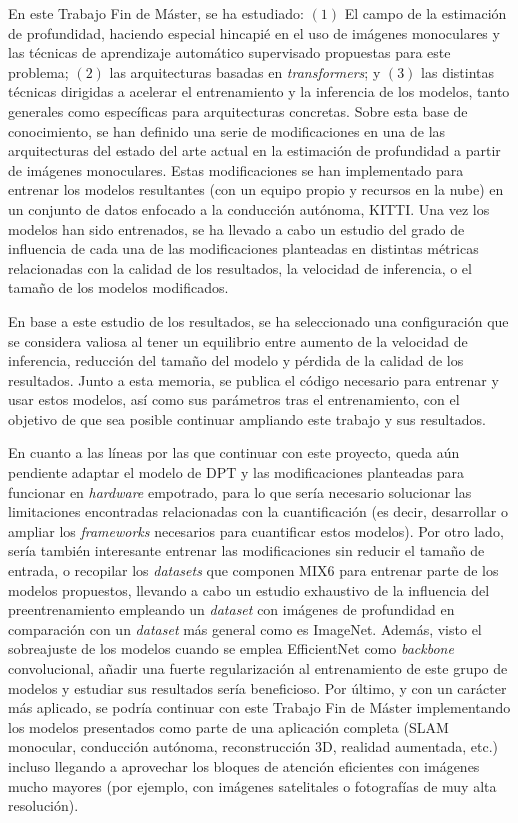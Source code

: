 En este Trabajo Fin de Máster, se ha estudiado: $(1)$ El campo de la estimación de profundidad, haciendo especial hincapié en el uso de imágenes monoculares y las técnicas de aprendizaje automático supervisado propuestas para este problema; $(2)$ las arquitecturas basadas en \textit{transformers}; y $(3)$ las distintas técnicas dirigidas a acelerar el entrenamiento y la inferencia de los modelos, tanto generales como específicas para arquitecturas concretas. Sobre esta base de conocimiento, se han definido una serie de modificaciones en una de las arquitecturas del estado del arte actual en la estimación de profundidad a partir de imágenes monoculares. Estas modificaciones se han implementado para entrenar los modelos resultantes (con un equipo propio y recursos en la nube) en un conjunto de datos enfocado a la conducción autónoma, KITTI. Una vez los modelos han sido entrenados, se ha llevado a cabo un estudio del grado de influencia de cada una de las modificaciones planteadas en distintas métricas relacionadas con la calidad de los resultados, la velocidad de inferencia, o el tamaño de los modelos modificados. 

En base a este estudio de los resultados, se ha seleccionado una configuración que se considera valiosa al tener un equilibrio entre aumento de la velocidad de inferencia, reducción del tamaño del modelo y pérdida de la calidad de los resultados. Junto a esta memoria, se publica el código necesario para entrenar y usar estos modelos, así como sus parámetros tras el entrenamiento, con el objetivo de que sea posible continuar ampliando este trabajo y sus resultados.

En cuanto a las líneas por las que continuar con este proyecto, queda aún pendiente adaptar el modelo de DPT y las modificaciones planteadas para funcionar en \textit{hardware} empotrado, para lo que sería necesario solucionar las limitaciones encontradas relacionadas con la cuantificación (es decir, desarrollar o ampliar los \textit{frameworks} necesarios para cuantificar estos modelos). Por otro lado, sería también interesante entrenar las modificaciones sin reducir el tamaño de entrada, o recopilar los \textit{datasets} que componen MIX6 para entrenar parte de los modelos propuestos, llevando a cabo un estudio exhaustivo de la influencia del preentrenamiento empleando un \textit{dataset} con imágenes de profundidad en comparación con un \textit{dataset} más general como es ImageNet. Además, visto el sobreajuste de los modelos cuando se emplea EfficientNet como \textit{backbone} convolucional, añadir una fuerte regularización al entrenamiento de este grupo de modelos y estudiar sus resultados sería beneficioso. Por último, y con un carácter más aplicado, se podría continuar con este Trabajo Fin de Máster implementando los modelos presentados como parte de una aplicación completa (SLAM monocular, conducción autónoma, reconstrucción 3D, realidad aumentada, etc.) incluso llegando a aprovechar los bloques de atención eficientes con imágenes mucho mayores (por ejemplo, con imágenes satelitales o fotografías de muy alta resolución).